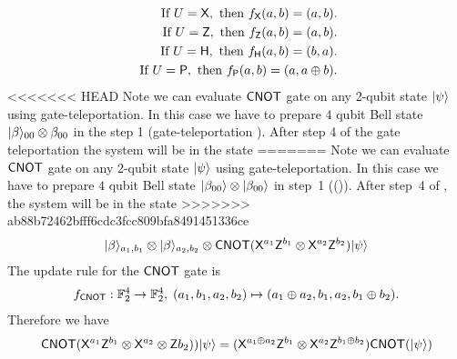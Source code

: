 \begin{equation*}
\begin{aligned}
\mbox{ If } U={\sf X},  \mbox{ then } f_{\sf X}(a,b)=(a,b).\\
\mbox{ If } U={\sf Z},  \mbox{ then } f_{\sf Z}(a,b)=(a,b).\\
\mbox{ If } U={\sf H},  \mbox{ then } f_{\sf H}(a,b)=(b,a).\\
\mbox{ If } U={\sf P},  \mbox{ then } f_ {\sf P}(a,b)=(a,a\oplus b).\\
\end{aligned}
\end{equation*}
<<<<<<< HEAD
Note we can evaluate ${\sf CNOT}$ gate on any 2-qubit state ${\lvert}\psi\rangle$ using gate-teleportation. In this case we have to prepare $4$ qubit Bell state ${\lvert}\beta\rangle_{00}\otimes \beta_{00}$ in the step 1 (gate-teleportation ). After step 4 of the gate teleportation the system will be in the state
=======
Note we can evaluate ${\sf CNOT}$ gate on any 2-qubit state ${\lvert}\psi\rangle$ using gate-teleportation. In this case we have to prepare $4$ qubit Bell state ${\lvert}\beta_{00}\rangle\otimes {\lvert}\beta_{00}\rangle$ in step~1 (()). After step~4 of , the system will be in the state
>>>>>>> ab88b72462bfff6cdc3fcc809bfa8491451336ce
\begin{equation*}
\begin{aligned}
 {\lvert}\beta\rangle_{a_1,b_1}\otimes {\lvert}\beta\rangle_{a_2,b_2} \otimes {\sf CNOT}({\sf X}^{a_1}{\sf Z}^{b_1}\otimes {\sf X}^{a_2}{\sf Z}^{b_2}){\lvert}\psi\rangle
\end{aligned}
\end{equation*}
The update rule for the ${\sf CNOT}$ gate is
\begin{equation*}
\begin{aligned}
f_{{\sf CNOT}}:\mathbb{F}_2^4\rightarrow \mathbb{F}_2^4, \; (a_1,b_1,a_2,b_2)\mapsto (a_1\oplus a_2,b_1,a_2, b_1\oplus b_2).
\end{aligned}
\end{equation*}
Therefore we have
\begin{equation*}
\begin{aligned}
  {\sf CNOT}({\sf X}^{a_1}{\sf Z}^{b_1}\otimes {\sf X}^{a_2}\otimes {\sf Z}{b_2})){\lvert}\psi\rangle= ({\sf X}^{a_1\oplus a_2}{\sf Z}^{b_1}\otimes {\sf X}^{a_2} {\sf Z}^{b_1\oplus b_2}){\sf CNOT}({\lvert}\psi\rangle)
 \end{aligned}
\end{equation*}
	
